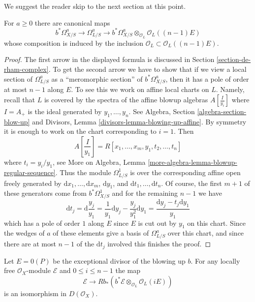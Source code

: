 \noindent
We suggest the reader skip to the next section at this point.

\begin{lemma}
\label{lemma-comparison-bis}
For $a \geq 0$ there are canonical maps
$$
b^*\Omega^a_{X/S} \longrightarrow
\Omega^a_{L/S} \longrightarrow
b^*\Omega^a_{X/S} \otimes_{\mathcal{O}_L} \mathcal{O}_L((n - 1)E)
$$
whose composition is induced by the inclusion
$\mathcal{O}_L \subset \mathcal{O}_L((n - 1)E)$.
\end{lemma}

\begin{proof}
The first arrow in the displayed formula is
discussed in Section \ref{section-de-rham-complex}.
To get the second arrow we have to show that if we view
a local section of $\Omega^a_{L/S}$ as a ``meromorphic section''
of $b^*\Omega^a_{X/S}$, then it has a pole of order at most
$n - 1$ along $E$. To see this we work on affine local charts
on $L$. Namely, recall that $L$ is covered by the spectra of the
affine blowup algebras $A[\frac{I}{y_i}]$ where $I = A_{+}$
is the ideal generated by $y_1, \ldots, y_n$. See
Algebra, Section \ref{algebra-section-blow-up} and
Divisors, Lemma \ref{divisors-lemma-blowing-up-affine}.
By symmetry it is enough to work on the
chart corresponding to $i = 1$. Then
$$
A[\frac{I}{y_1}] = R[x_1, \ldots, x_m, y_1, t_2, \ldots, t_n]
$$
where $t_i = y_i/y_1$, see
More on Algebra, Lemma \ref{more-algebra-lemma-blowup-regular-sequence}.
Thus the module $\Omega^1_{L/S}$ is over the corresponding
affine open freely generated by
$\text{d}x_1, \ldots, \text{d}x_m$, $\text{d}y_1$, and
$\text{d}t_1, \ldots, \text{d}t_n$.
Of course, the first $m + 1$ of these generators come from
$b^*\Omega^1_{X/S}$ and for the remaining $n - 1$ we have
$$
\text{d}t_j =
\text{d}\frac{y_j}{y_1} =
\frac{1}{y_1}\text{d}y_j - \frac{y_j}{y_1^2}\text{d}y_1 =
\frac{\text{d}y_j - t_j \text{d}y_1}{y_1}
$$
which has a pole of order $1$ along $E$ since $E$ is cut out by $y_1$
on this chart. Since the wedges of $a$ of these elements give a basis
of $\Omega^a_{L/S}$ over this chart, and since there are at most
$n - 1$ of the $\text{d}t_j$ involved this finishes the proof.
\end{proof}

\begin{lemma}
\label{lemma-blowup-twist-same-cohomology}
Let $E = 0(P)$ be the exceptional divisor of the blowing up $b$.
For any locally free $\mathcal{O}_X$-module $\mathcal{E}$ and
$0 \leq i \leq n - 1$ the map
$$
\mathcal{E}
\longrightarrow
Rb_*(b^*\mathcal{E} \otimes_{\mathcal{O}_L} \mathcal{O}_L(iE))
$$
is an isomorphism in $D(\mathcal{O}_X)$.
\end{lemma}

